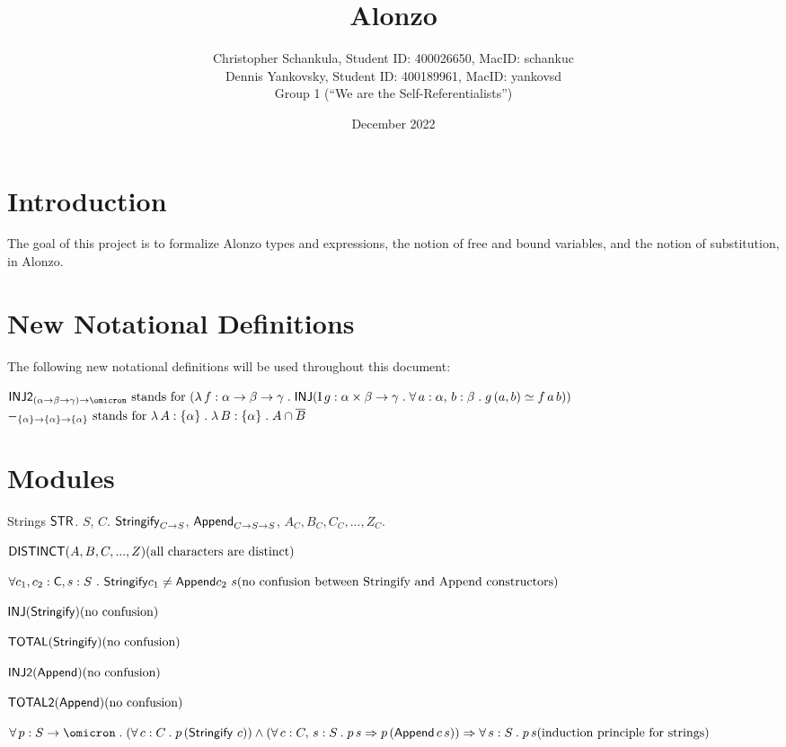 \documentclass{article}
\title{Alo\color{lightgray}{alonzo}\color{black}nzo}
\author{Christopher Schankula, Student ID: 400026650, MacID: schankuc\\ Dennis Yankovsky, Student ID: 400189961, MacID: yankovsd\\Group 1 (``We are the Self-Referentialists'')}
\date{December 2022}
\newcommand{\axNote}[1]{\hfill (\text{#1})}
\newcommand{\axNoteNL}[1]{\\ \text{} \axNote{#1}}
\newcommand{\cInjB}[1]{\mName{INJ2}(#1)}
\begin{document}
\maketitle

\section{Introduction}
The goal of this project is to formalize Alonzo types and expressions, the notion of free and bound variables,
and the notion of substitution, in Alonzo.

\section{New Notational Definitions}
The following new notational definitions will be used throughout this document:

\noindent$\mName{INJ2}_{\cFunTyX{\cFunTyB{\alpha}{\beta}{\gamma}}{\cB}} \text{ stands for }
\cFunAbs{f}{\cFunTyBX{\alpha}{\beta}{\gamma}}{\cInj{\cDefDesX{g}{\cFunTyX{\alpha \times \beta}{\gamma}}{\cForallBX{a}{\alpha}{b}{\beta}{\cFunAppX{g}{(a,b)} \simeq \cFunAppBX{f}{a}{b}}}}}
$\\

\noindent$\mathsf{-_{{\{\alpha\}} \rightarrow {{\{\alpha\}} \rightarrow {\{\alpha\}}}}} \text{ stands for } \lambda\, A : \{ \alpha \} \mathrel{.} \lambda\, B : \{ \alpha \} \mathrel{.} A \cap \overline{B}$

\newpage
\section{Modules}
\begin{theory-def}
{Strings}
{$\mathsf{STR}$.}
{$S$, $C$.}
{$\mathsf{Stringify}_{{C} \rightarrow {S}}$, $\mathsf{Append}_{{C} \rightarrow {{S} \rightarrow {S}}}$,
$A_C, B_C, C_C, ... , Z_C$.}
{}
{\be
\item $\cDistinctL{A,B,C,...,Z} \axNote{all characters are distinct}$
\item $\forall c_1, c_2: \mName{C}, s: S\ .\ \mName{Stringify } c_1 \neq \mName{Append } c_2\ s \axNoteNL{no confusion between Stringify and Append constructors}$
\item $\cInj{\mName{Stringify}} \axNote{no confusion}$
\item $\cTotal{\mName{Stringify}} \axNote{no confusion}$
\item $\cInjB{\mName{Append}} \axNote{no confusion}$
\item $\cTotalB{\mName{Append}} \axNote{no confusion}$
\item $\cForallX{p}{\cFunTyX{S}{\cB}}{\cForall{c}{C}{\cFunAppX{p} {(\mName{Stringify}\ c)}}} \land\\
\cForallB{c}{C}{s}{S}{\cFunAppX{p}{s} \Implies
\cFunAppX{p}{\cFunAppB{\mName{Append}}{c}{s}}}\\
\Implies \cForallX{s}{S}{\cFunAppX {p}{s}}
\axNote{induction principle for strings}$
\ee}
\end{theory-def}
\end{document}
